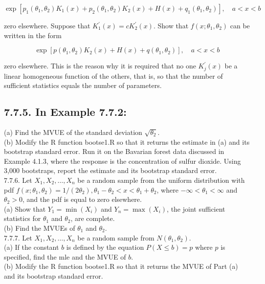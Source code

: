 $$
\exp \left[p_{1}\left(\theta_{1}, \theta_{2}\right) K_{1}(x)+p_{2}\left(\theta_{1}, \theta_{2}\right) K_{2}(x)+H(x)+q_{1}\left(\theta_{1}, \theta_{2}\right)\right], \quad a<x<b
$$

zero elsewhere. Suppose that $K_{1}^{\prime}(x)=c K_{2}^{\prime}(x)$. Show that $f\left(x ; \theta_{1}, \theta_{2}\right)$ can be written in the form

$$
\exp \left[p\left(\theta_{1}, \theta_{2}\right) K_{2}(x)+H(x)+q\left(\theta_{1}, \theta_{2}\right)\right], \quad a<x<b
$$

zero elsewhere. This is the reason why it is required that no one $K_{j}^{\prime}(x)$ be a linear homogeneous function of the others, that is, so that the number of sufficient statistics equals the number of parameters.

\subsection*{7.7.5. In Example 7.7.2:}
(a) Find the MVUE of the standard deviation $\sqrt{\theta_{2}}$.\\
(b) Modify the R function bootse1.R so that it returns the estimate in (a) and its bootstrap standard error. Run it on the Bavarian forest data discussed in Example 4.1.3, where the response is the concentration of sulfur dioxide. Using 3,000 bootstraps, report the estimate and its bootstrap standard error.\\
7.7.6. Let $X_{1}, X_{2}, \ldots, X_{n}$ be a random sample from the uniform distribution with pdf $f\left(x ; \theta_{1}, \theta_{2}\right)=1 /\left(2 \theta_{2}\right), \theta_{1}-\theta_{2}<x<\theta_{1}+\theta_{2}$, where $-\infty<\theta_{1}<\infty$ and $\theta_{2}>0$, and the pdf is equal to zero elsewhere.\\
(a) Show that $Y_{1}=\min \left(X_{i}\right)$ and $Y_{n}=\max \left(X_{i}\right)$, the joint sufficient statistics for $\theta_{1}$ and $\theta_{2}$, are complete.\\
(b) Find the MVUEs of $\theta_{1}$ and $\theta_{2}$.\\
7.7.7. Let $X_{1}, X_{2}, \ldots, X_{n}$ be a random sample from $N\left(\theta_{1}, \theta_{2}\right)$.\\
(a) If the constant $b$ is defined by the equation $P(X \leq b)=p$ where $p$ is specified, find the mle and the MVUE of $b$.\\
(b) Modify the R function bootse1.R so that it returns the MVUE of Part (a) and its bootstrap standard error.\\
